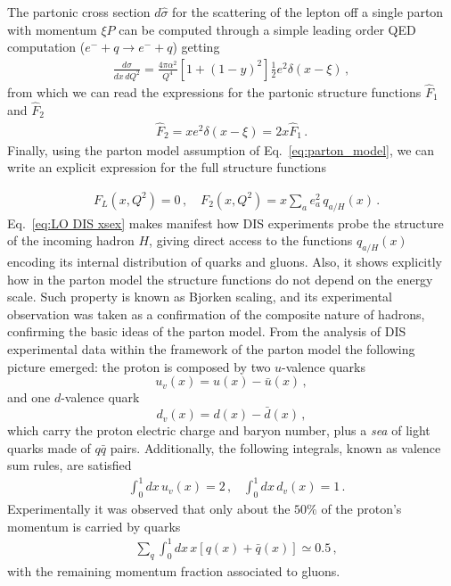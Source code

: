 %
The partonic cross section $d\hat{\sigma}$ for the scattering of the lepton off a single parton with momentum $\xi P$
can be computed through a simple leading order QED computation ($e^- + q \rightarrow e^- + q $) getting
\begin{align}
    \frac{d\hat{\sigma}}{dx\, dQ^2} = 
    \frac{4\pi \alpha^2}{Q^4}\left[1+\left(1-y\right)^2\right]\frac{1}{2} e^2\delta\left(x-\xi\right)\,,
\end{align}
from which we can read the expressions for the partonic structure functions 
$\hat{F}_1$ and $\hat{F}_2$
\begin{align}
    \hat{F}_2 = x e^2 \delta\left(x-\xi\right) = 2x \hat{F}_1\,.
\end{align}
%
Finally, using the parton model assumption of Eq.~\eqref{eq:parton_model}, we can write
an explicit expression for the full structure functions

\begin{align}
    \label{eq:LO DIS xsex}
    &F_L\left(x,Q^2\right) = 0\,,\,\,\,\,\,\, 
    F_2\left(x,Q^2\right) = x\sum_a e_a^2\, q_{a/H}\left(x\right)\,. 
\end{align} 
Eq.~\eqref{eq:LO DIS xsex} makes manifest how DIS experiments probe the structure of the incoming hadron $H$,
giving direct access to the functions $q_{a/H}\left(x\right) $ encoding its internal distribution of quarks and gluons.
Also, it shows explicitly how in the parton model the structure functions do not depend on the energy scale.
Such property is known as Bjorken scaling, and its experimental observation was taken as a confirmation
of the composite nature of hadrons, confirming the basic ideas of the parton model.
From the analysis of DIS experimental data within the framework of the parton model the following picture emerged: 
the proton is composed by two $u$-valence quarks
\[
    u_v\left(x\right) = u\left(x\right) - \bar{u}\left(x\right)\,,
\]
and one $d$-valence quark
\[
    d_v\left(x\right) = d\left(x\right) - \bar{d}\left(x\right)\,,
\]
which carry the proton electric charge and baryon number, plus a \textit{sea} of light quarks made of $q\bar{q}$ pairs.
Additionally, the following integrals, known as valence sum rules, are satisfied
\begin{align}
    \label{eq:valence_sumrules_parton_model}
    &\int_0^1 dx \, u_v\left(x\right) = 2\,,\,\,\,\,\,  
    \int_0^1 dx \, d_v\left(x\right) = 1\,.
\end{align}
Experimentally it was observed that only about the $50\%$ of the proton's momentum is carried by quarks
\begin{align}    
    &\sum_q \int_0^1 dx \, x\left[q\left(x\right) + \bar{q}\left(x\right)\right] \simeq 0.5\,,
\end{align}
with the remaining momentum fraction associated to gluons.

